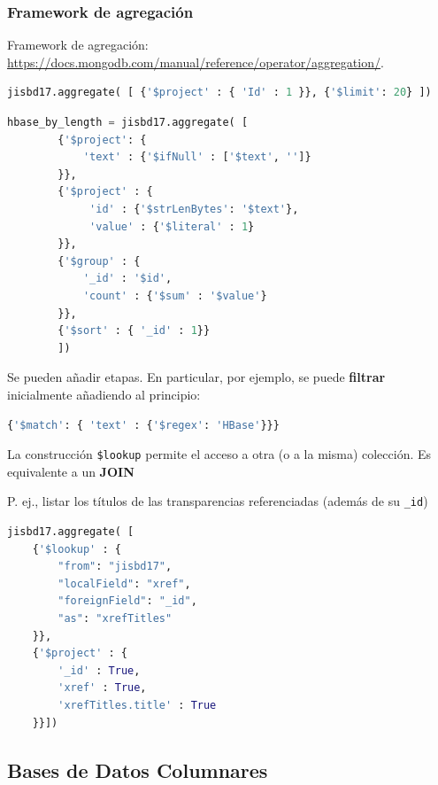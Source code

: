\documentclass[14pt]{beamer}
\begin{document}
\begin{frame}
  \frametitle{Framework de agregación}
Framework de agregación:
\url{https://docs.mongodb.com/manual/reference/operator/aggregation/}.

\begin{lstlisting}[language=python]
jisbd17.aggregate( [ {'$project' : { 'Id' : 1 }}, {'$limit': 20} ])
\end{lstlisting}

\framebreak

\begin{lstlisting}[language=python]
hbase_by_length = jisbd17.aggregate( [
        {'$project': {
            'text' : {'$ifNull' : ['$text', '']}
        }},
        {'$project' : {
             'id' : {'$strLenBytes': '$text'},
             'value' : {'$literal' : 1}
        }},
        {'$group' : {
            '_id' : '$id',
            'count' : {'$sum' : '$value'}
        }},
        {'$sort' : { '_id' : 1}}
        ])
\end{lstlisting}

\framebreak

Se pueden añadir etapas. En particular, por ejemplo, se puede {\bf filtrar}
inicialmente añadiendo al principio:

\begin{lstlisting}[language=python]
{'$match': { 'text' : {'$regex': 'HBase'}}}
\end{lstlisting}

La construcción
\verb|$lookup| permite el acceso a otra (o a la misma) colección. Es
equivalente a un {\bf JOIN}

\framebreak

\begin{block}{}
  P. ej., listar los títulos de las transparencias referenciadas
  (además de su {\tt \_id})

\begin{lstlisting}[language=python]
jisbd17.aggregate( [
    {'$lookup' : {
        "from": "jisbd17",
        "localField": "xref",
        "foreignField": "_id",
        "as": "xrefTitles"
    }},
    {'$project' : {
        '_id' : True,
        'xref' : True,
        'xrefTitles.title' : True
    }}])
\end{lstlisting}
\end{block}

\end{frame}

\subsection{Bases de Datos Columnares}
\end{document}
